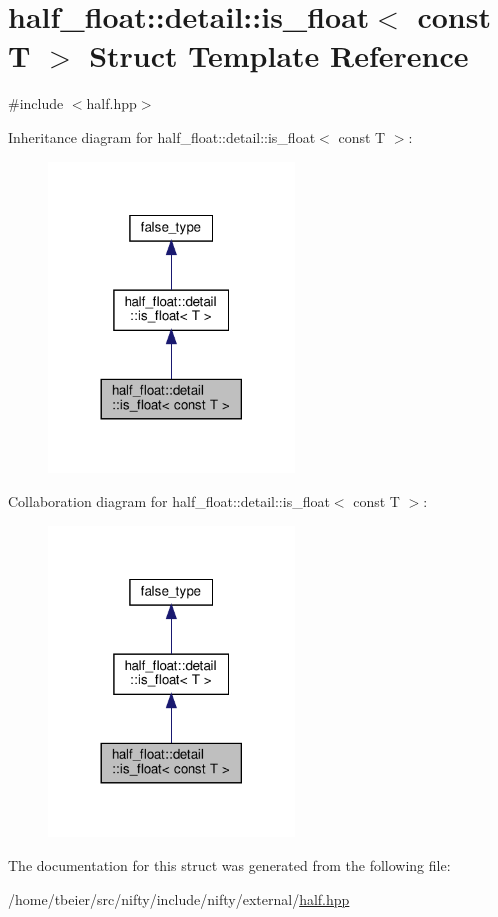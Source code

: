 \hypertarget{structhalf__float_1_1detail_1_1is__float_3_01const_01T_01_4}{}\section{half\+\_\+float\+:\+:detail\+:\+:is\+\_\+float$<$ const T $>$ Struct Template Reference}
\label{structhalf__float_1_1detail_1_1is__float_3_01const_01T_01_4}


{\ttfamily \#include $<$half.\+hpp$>$}



Inheritance diagram for half\+\_\+float\+:\+:detail\+:\+:is\+\_\+float$<$ const T $>$\+:
\nopagebreak
\begin{figure}[H]
\begin{center}
\leavevmode
\includegraphics[width=185pt]{structhalf__float_1_1detail_1_1is__float_3_01const_01T_01_4__inherit__graph}
\end{center}
\end{figure}


Collaboration diagram for half\+\_\+float\+:\+:detail\+:\+:is\+\_\+float$<$ const T $>$\+:
\nopagebreak
\begin{figure}[H]
\begin{center}
\leavevmode
\includegraphics[width=185pt]{structhalf__float_1_1detail_1_1is__float_3_01const_01T_01_4__coll__graph}
\end{center}
\end{figure}


The documentation for this struct was generated from the following file\+:\begin{DoxyCompactItemize}
\item 
/home/tbeier/src/nifty/include/nifty/external/\hyperlink{half_8hpp}{half.\+hpp}\end{DoxyCompactItemize}

